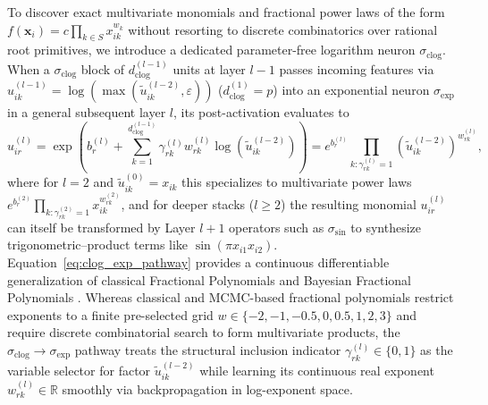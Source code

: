 \documentclass[11pt,a4paper]{article}
\begin{document}
To discover exact multivariate monomials and fractional power laws of the form $f(\bm{x}_i) = c \prod_{k \in S} x_{ik}^{w_k}$ without resorting to discrete combinatorics over rational root primitives, we introduce a dedicated parameter-free logarithm neuron $\sigma_{\text{clog}}$. When a $\sigma_{\text{clog}}$ block of $d_{\text{clog}}^{(l-1)}$ units at layer $l - 1$ passes incoming features via $u_{ik}^{(l-1)} = \log(\max(\tilde{u}_{ik}^{(l-2)}, \varepsilon))$ ($d_{\text{clog}}^{(1)} = p$) into an exponential neuron $\sigma_{\exp}$ in a general subsequent layer $l$, its post-activation evaluates to
\begin{equation}
\label{eq:clog_exp_pathway}
u_{ir}^{(l)} = \exp\!\left(b_r^{(l)} + \sum_{k=1}^{d_{\text{clog}}^{(l-1)}} \gamma_{rk}^{(l)} w_{rk}^{(l)} \log\!\left(\tilde{u}_{ik}^{(l-2)}\right)\right) = e^{b_r^{(l)}} \prod_{k : \gamma_{rk}^{(l)} = 1} \left(\tilde{u}_{ik}^{(l-2)}\right)^{w_{rk}^{(l)}},
\end{equation}
where for $l = 2$ and $\tilde{u}_{ik}^{(0)} = x_{ik}$ this specializes to multivariate power laws $e^{b_r^{(2)}} \prod_{k : \gamma_{rk}^{(2)}=1} x_{ik}^{w_{rk}^{(2)}}$, and for deeper stacks ($l \ge 2$) the resulting monomial $u_{ir}^{(l)}$ can itself be transformed by Layer $l+1$ operators such as $\sigma_{\sin}$ to synthesize trigonometric--product terms like $\sin(\pi x_{i1} x_{i2})$. Equation~\eqref{eq:clog_exp_pathway} provides a continuous differentiable generalization of classical Fractional Polynomials \citep{royston1994regression} and Bayesian Fractional Polynomials \citep{hubin2023fractional}. Whereas classical and MCMC-based fractional polynomials restrict exponents to a finite pre-selected grid $w \in \{-2, -1, -0.5, 0, 0.5, 1, 2, 3\}$ and require discrete combinatorial search to form multivariate products, the $\sigma_{\text{clog}} \to \sigma_{\exp}$ pathway treats the structural inclusion indicator $\gamma_{rk}^{(l)} \in \{0, 1\}$ as the variable selector for factor $\tilde{u}_{ik}^{(l-2)}$ while learning its continuous real exponent $w_{rk}^{(l)} \in \mathbb{R}$ smoothly via backpropagation in log-exponent space.
\end{document}
